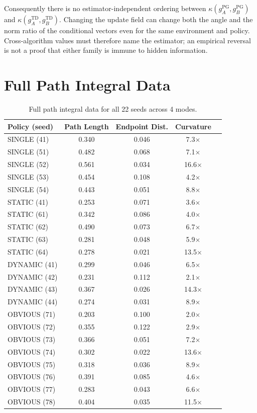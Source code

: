 \documentclass[letterpaper]{article}
\begin{document}
Consequently there is no estimator-independent ordering between
$\kappa(g_A^{\text{PG}},g_B^{\text{PG}})$ and
$\kappa(g_A^{\text{TD}},g_B^{\text{TD}})$. Changing the update field can change
both the angle and the norm ratio of the conditional vectors even for the same
environment and policy. Cross-algorithm values must therefore name the
estimator; an empirical reversal is not a proof that either family is immune to
hidden information.

\clearpage
\section{Full Path Integral Data}

\begin{table}[H]
\centering
\small
\begin{tabular}{lcccc}
\toprule
Policy (seed) & Path Length & Endpoint Dist. & Curvature \\
\midrule
SINGLE (41)   & 0.340 & 0.046 & 7.3$\times$ \\
SINGLE (51)   & 0.482 & 0.068 & 7.1$\times$ \\
SINGLE (52)   & 0.561 & 0.034 & 16.6$\times$ \\
SINGLE (53)   & 0.454 & 0.108 & 4.2$\times$ \\
SINGLE (54)   & 0.443 & 0.051 & 8.8$\times$ \\
STATIC (41)   & 0.253 & 0.071 & 3.6$\times$ \\
STATIC (61)   & 0.342 & 0.086 & 4.0$\times$ \\
STATIC (62)   & 0.490 & 0.073 & 6.7$\times$ \\
STATIC (63)   & 0.281 & 0.048 & 5.9$\times$ \\
STATIC (64)   & 0.278 & 0.021 & 13.5$\times$ \\
DYNAMIC (41)  & 0.299 & 0.046 & 6.5$\times$ \\
DYNAMIC (42)  & 0.231 & 0.112 & 2.1$\times$ \\
DYNAMIC (43)  & 0.367 & 0.026 & 14.3$\times$ \\
DYNAMIC (44)  & 0.274 & 0.031 & 8.9$\times$ \\
OBVIOUS (71)  & 0.203 & 0.100 & 2.0$\times$ \\
OBVIOUS (72)  & 0.355 & 0.122 & 2.9$\times$ \\
OBVIOUS (73)  & 0.366 & 0.051 & 7.2$\times$ \\
OBVIOUS (74)  & 0.302 & 0.022 & 13.6$\times$ \\
OBVIOUS (75)  & 0.318 & 0.036 & 8.9$\times$ \\
OBVIOUS (76)  & 0.391 & 0.085 & 4.6$\times$ \\
OBVIOUS (77)  & 0.283 & 0.043 & 6.6$\times$ \\
OBVIOUS (78)  & 0.404 & 0.035 & 11.5$\times$ \\
\bottomrule
\end{tabular}
\caption{Full path integral data for all 22 seeds across 4 modes.}
\end{table}
\end{document}
